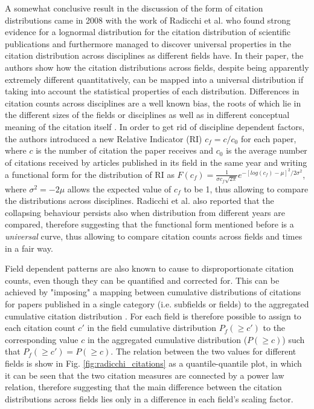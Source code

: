 A somewhat conclusive result in the discussion of the form of citation distributions came in 2008
with the work of Radicchi et al. \cite{Radicchi11112008} who found strong evidence for a lognormal distribution for the citation distribution of scientific publications and furthermore managed
to discover universal properties in the citation distribution across disciplines as different fields have. 
In their paper, the authors show how the citation distributions across fields, despite being apparently extremely different quantitatively,
can be mapped into a universal distribution if taking into account the statistical properties of each distribution. Differences
in citation counts across disciplines are a well known bias, the roots of which
lie in the different sizes of the fields or disciplines \cite{KING87} as well as in different conceptual meaning of the citation itself \cite{HURT19871}. In order to get rid of discipline dependent factors, the authors
introduced a new Relative Indicator (RI) $c_{f} = c/c_{0} $ for each paper, where $c$ is the number of citation the paper receives and $c_{0}$ is the average
number of citations received by articles published in its field in the same year and writing a functional form for the distribution of RI as $F(c_{f}) = \frac{1}{\sigma c_{f}\sqrt{2\pi}} e^{-[log(c_{f}) - \mu]^{2}/2\sigma^{2}}$, where 
$\sigma^{2} = -2\mu$ allows the expected value of $c_{f}$ to be 1, thus allowing to compare the distributions across disciplines. Radicchi et al. also reported that the collapsing behaviour persists also when distribution from different years are compared, therefore suggesting that the functional form mentioned before
is a \textit{universal} curve, thus allowing to compare citation counts across fields and times in a fair way. 

Field dependent patterns are also known to cause
to disproportionate citation counts, even though they can be quantified and corrected for. This can be achieved by
"imposing" a mapping between cumulative distributions of citations for papers published in a single category (i.e. subfields or fields) to the aggregated cumulative citation distribution  \cite{10.1371/journal.pone.0033833}. For each field
is therefore possible to assign to each citation count $c'$ in the field cumulative distribution $P_{f}(\geq c')$ to the corresponding value $c$ in the aggregated cumulative distribution
($P(\geq c)$) such that $P_{f}(\geq c') = P(\geq c)$. The relation between the two values for different fields is show in Fig. \ref{fig:radicchi_citations} as a quantile-quantile plot, in which
it can be seen that the two citation measures are connected by a power law relation, therefore suggesting that the main difference between the citation distributions across
fields lies only in a difference in each field's scaling factor.

